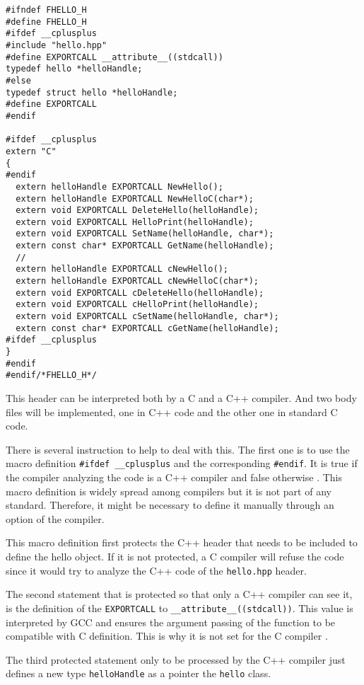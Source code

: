 \documentclass[A4paper]{article}
\begin{document}
\begin{verbatim}
#ifndef FHELLO_H
#define FHELLO_H
#ifdef __cplusplus
#include "hello.hpp"
#define EXPORTCALL __attribute__((stdcall))
typedef hello *helloHandle;
#else
typedef struct hello *helloHandle;
#define EXPORTCALL
#endif

#ifdef __cplusplus
extern "C"
{
#endif
  extern helloHandle EXPORTCALL NewHello();
  extern helloHandle EXPORTCALL NewHelloC(char*);
  extern void EXPORTCALL DeleteHello(helloHandle);
  extern void EXPORTCALL HelloPrint(helloHandle);
  extern void EXPORTCALL SetName(helloHandle, char*);
  extern const char* EXPORTCALL GetName(helloHandle);
  //
  extern helloHandle EXPORTCALL cNewHello();
  extern helloHandle EXPORTCALL cNewHelloC(char*);
  extern void EXPORTCALL cDeleteHello(helloHandle);
  extern void EXPORTCALL cHelloPrint(helloHandle);
  extern void EXPORTCALL cSetName(helloHandle, char*);
  extern const char* EXPORTCALL cGetName(helloHandle);
#ifdef __cplusplus
}
#endif
#endif/*FHELLO_H*/
\end{verbatim}

This header can be interpreted both by a C and a C++ compiler. And two body
files will be implemented, one in C++ code and the other one in standard C
code.

There is several instruction to help to deal with this. The first one is to
use the macro definition \verb|#ifdef __cplusplus| and the corresponding
\verb|#endif|. It is true if the compiler analyzing the code is a C++ compiler
and false otherwise \cite{C++,gcc}. This macro definition is widely spread
among compilers but it is not part of any standard. Therefore, it might be
necessary to define it manually through an option of the compiler.

This macro definition first protects the C++ header that needs to be included
to define the hello object. If it is not protected, a C compiler will refuse the
code since it would try to analyze the C++ code of the \verb|hello.hpp|
header.

The second statement that is protected so that only a C++ compiler can see it,
is the definition of the \verb|EXPORTCALL| to
\verb|__attribute__((stdcall))|. This value is interpreted by GCC and ensures
the argument passing of the function to be compatible with C definition. This
is why it is not set for the C compiler \cite{gcc,Rudy2006}.

The third protected statement only to be processed by the C++ compiler just
defines a new type \verb|helloHandle| as a pointer the \verb|hello|
class.
\end{document}
